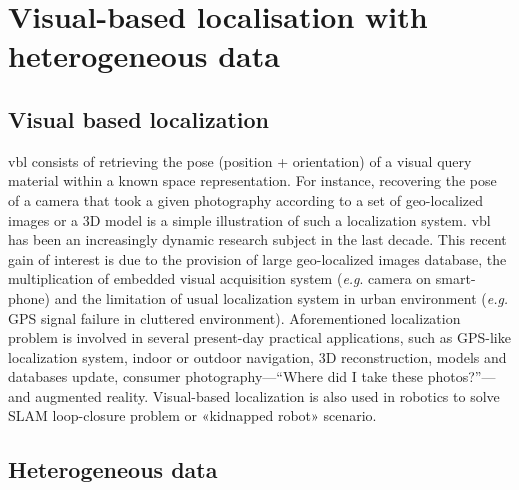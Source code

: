 \section{Visual-based localisation with heterogeneous data}

\subsection{Visual based localization}

		\Ac{vbl} consists of retrieving the pose (position + orientation) of a visual query material within a known space representation. For instance, recovering the pose of a camera that took a given photography according to a set of geo-localized images or a 3D model is a simple illustration of such a localization system. \ac{vbl} has been an increasingly dynamic research subject in the last decade. This recent gain of interest is due to the provision of large geo-localized images database, the multiplication of embedded visual acquisition system (\textit{e.g}. camera on smart-phone) and the limitation of usual localization system in urban environment (\textit{e.g.} GPS signal failure in cluttered environment). Aforementioned localization problem is involved in several present-day practical applications, such as GPS-like localization system, indoor or outdoor navigation, 3D reconstruction, models and databases update, consumer photography---``Where did I take these photos?''---and augmented reality. Visual-based localization is also used in robotics to solve SLAM loop-closure problem or «kidnapped robot» scenario.
		
\subsection{Heterogeneous data}